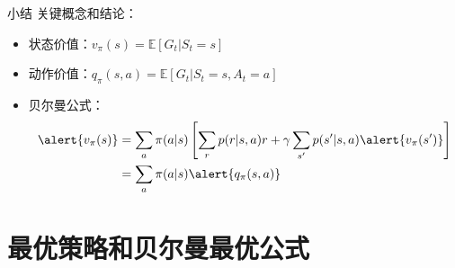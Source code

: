 \documentclass[aspectratio=169,xcolor=dvipsnames]{beamer}
\begin{document}
\begin{frame}{小结}
    关键概念和结论：
    \begin{itemize}
        \item 状态价值：$v_\pi(s)=\mathbb{E}[G_t|S_t=s]$
        \item 动作价值：$q_\pi(s,a)=\mathbb{E}[G_t|S_t=s,A_t=a]$
        \item 贝尔曼公式：
        \[
            \begin{aligned}
                \alert{v_\pi(s)}&=\sum_a\pi(a|s)\left[\sum_r p(r|s,a)r+\gamma\sum_{s'}p(s'|s,a)\alert{v_{\pi}(s')}\right] \\
                &=\sum_a\pi(a|s)\alert{q_\pi(s,a)}
            \end{aligned}
        \]
    \end{itemize}
\end{frame}

\section{最优策略和贝尔曼最优公式}
\end{document}
